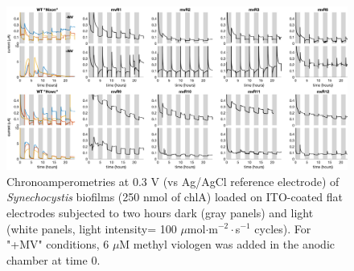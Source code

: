 \documentclass[12pt]{article}
\begin{document}
\begin{figure}[H]
    \centering
    \includegraphics[width=\hsize]{../Figures/MV_adaptation/MVR_chronoamp_panels_all.png}
    \caption{Chronoamperometries at 0.3 V (vs Ag/AgCl reference electrode) of \textit{Synechocystis} biofilms (250 nmol of chlA) loaded on ITO-coated flat electrodes subjected to two hours dark (gray panels) and light (white panels, light intensity= 100 $\mu$mol$\cdot$m$^{-2}\cdot$s$^{-1}$ cycles). For "+MV" conditions, 6 $\mu$M methyl viologen was added in the anodic chamber at time 0.
    }
    \label{fig:SWVC}
\end{figure}



\end{document}

